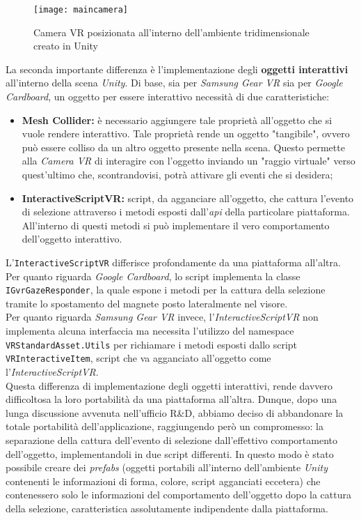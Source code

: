 \label{MainCamera}
\begin{figure}[ht]
	\begin{center}
		\texttt{[image: maincamera]}
		\caption{Camera VR posizionata all'interno dell'ambiente tridimensionale creato in Unity}
	\end{center}
\end{figure}
\FloatBarrier

La seconda importante differenza è l'implementazione degli \textbf{oggetti interattivi} all'interno della scena \textit{Unity}. Di base, sia per \textit{Samsung Gear VR} sia per \textit{Google Cardboard}, un oggetto per essere interattivo necessità di due caratteristiche:

\begin{itemize}
	\item \textbf{Mesh Collider:} è necessario aggiungere tale proprietà all'oggetto che si vuole rendere interattivo. Tale proprietà rende un oggetto "tangibile", ovvero può essere colliso da un altro oggetto presente nella scena. Questo permette alla \textit{Camera VR} di interagire con l'oggetto inviando un "raggio virtuale" verso quest'ultimo che, scontrandovisi, potrà attivare gli eventi che si desidera;
	\item \textbf{InteractiveScriptVR:} script, da agganciare all'oggetto, che cattura l'evento di selezione attraverso i metodi esposti dall'\textit{api} della particolare piattaforma. All'interno di questi metodi si può implementare il vero comportamento dell'oggetto interattivo.  
\end{itemize}

L'\texttt{InteractiveScriptVR} differisce profondamente da una piattaforma all'altra. \\
Per quanto riguarda \textit{Google Cardboard}, lo script implementa la classe \texttt{IGvrGazeResponder}, la quale espone i metodi per la cattura della selezione tramite lo spostamento del magnete posto lateralmente nel visore. \\
Per quanto riguarda \textit{Samsung Gear VR} invece, l'\textit{InteractiveScriptVR} non implementa alcuna interfaccia ma necessita l'utilizzo del namespace \texttt{VRStandardAsset.Utils} per richiamare i metodi esposti dallo script \texttt{VRInteractiveItem}, script che va agganciato all'oggetto come l'\textit{InteractiveScriptVR}. \\
Questa differenza di implementazione degli oggetti interattivi, rende davvero difficoltosa la loro portabilità da una piattaforma all'altra. Dunque, dopo una lunga discussione avvenuta nell'ufficio R\&D, abbiamo deciso di abbandonare la totale portabilità dell'applicazione, raggiungendo però un compromesso: la separazione della cattura dell'evento di selezione dall'effettivo comportamento dell'oggetto, implementandoli in due script differenti. In questo modo è stato possibile creare dei \textit{prefabs} (oggetti portabili all'interno dell'ambiente \textit{Unity} contenenti le informazioni di forma, colore, script agganciati eccetera) che contenessero solo le informazioni del comportamento dell'oggetto dopo la cattura della selezione, caratteristica assolutamente indipendente dalla piattaforma.    


